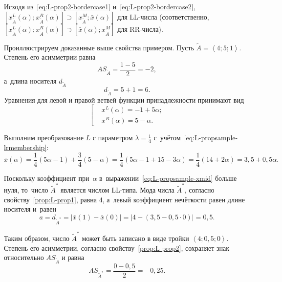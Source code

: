 Исходя из~\eqref{eq:L-prop2-bordercase1} и~\eqref{eq:L-prop2-bordercase2}, $\left[ x_{\tilde A}^{L}(\alpha );x_{\tilde A}^{R}(\alpha ) \right]\supset \left[ x_{\tilde A}^{M};\bar{x}(\alpha ) \right]$ для LL-числа (соответственно, $\left[ x_{\tilde A}^{L}(\alpha ); x_{\tilde A}^{R}(\alpha ) \right] \supset \left[ \bar{x}(\alpha ); x_{\tilde A}^{M} \right]$ для RR-числа).

Проиллюстрируем доказанные выше свойства примером. Пусть $\tilde{A}=\left\langle 4;5;1 \right\rangle $. Степень его асимметрии равна
\begin{equation*}
  AS_{\tilde A}=\frac{1-5}{2}=-2,
\end{equation*}
а~длина носителя $d_{\tilde A}$
\begin{equation*}
  d_{\tilde A}=5+1=6.
\end{equation*}
Уравнения для левой и правой ветвей функции принадлежности принимают вид
\begin{equation}
\label{eq:L-propsample-lrmembership}
  \left[ \begin{aligned}
    & {{x}^{L}}\left( \alpha  \right)=-1+5\alpha; \\ 
    & {{x}^{R}}\left( \alpha  \right)=5-\alpha.
  \end{aligned} \right.
\end{equation}

Выполним преобразование $L$ с параметром $\lambda =\frac{1}{4}$ с~учётом~\eqref{eq:L-propsample-lrmembership}:
\begin{equation}
\label{eq:L-propsample-xmid}
  \bar{x}\left( \alpha  \right)=\frac{1}{4}\left( 5\alpha -1 \right)+\frac{3}{4}\left( 5-\alpha  \right)=\frac{1}{4}\left( 5\alpha -1+15-3\alpha  \right)=\frac{1}{4}\left( 14+2\alpha  \right)=3,5+0,5\alpha.
\end{equation}

Поскольку коэффициент при~$\alpha $ в~выражении~\eqref{eq:L-propsample-xmid} больше нуля, то~число $\tilde A^{*}$ является числом LL-типа. Мода числа $\tilde A^{*}$, согласно свойству~\ref{prop:L-prop1}, равна 4, а~левый коэффициент нечёткости равен длине носителя и~равен
\begin{equation*}
  a=d_{\tilde A^{*}}=\left| \bar{x}\left( 1 \right)-\bar{x}\left( 0 \right) \right|=\left| 4-\left( 3,5-0,5\cdot 0 \right) \right|=0,5.
\end{equation*}

Таким образом, число $\tilde A^{*}$ может быть записано в виде тройки $\left\langle 4;0,5;0 \right\rangle $. Степень его асимметрии, согласно свойству~\ref{prop:L-prop2}, сохраняет знак относительно $AS_{\tilde A}$ и равна
\begin{equation*}
  AS_{\tilde A^{*}}=\frac{0-0,5}{2}=-0,25.
\end{equation*}

